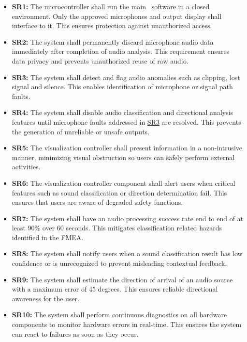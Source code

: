 \documentclass{article}
\begin{document}
\begin{itemize}
    \item \label{SR1}\textbf{SR1:} The microcontroller shall run the main
    \progname ~software in a closed environment. Only the approved microphones
    and output display shall interface to it. This ensures protection against
    unauthorized access.

    \item \label{SR2}\textbf{SR2:} The system shall permanently discard
    microphone audio data immediately after completion of audio analysis. This
    requirement ensures data privacy and prevents unauthorized reuse of raw
    audio.

    \item \label{SR3}\textbf{SR3:} The system shall detect and flag audio
    anomalies such as clipping, lost signal and silence. This enables
    identification of microphone or signal path faults.

    \item \label{SR4}\textbf{SR4:} The system shall disable audio classification
    and directional analysis features until microphone faults addressed in
    \hyperref[SR3]{SR3} are resolved. This prevents the generation of unreliable
    or unsafe outputs.

    \item \label{SR5}\textbf{SR5:} The visualization controller shall present
    information in a non-intrusive manner, minimizing visual obstruction so
    users can safely perform external activities.

    \item \label{SR6}\textbf{SR6:} The visualization controller component shall
    alert users when critical features such as sound classification or direction
    determination fail. This ensures that users are aware of degraded safety
    functions.

    \item \label{SR7}\textbf{SR7:} The system shall have an audio processing
    success rate end to end of at least 90\% over 60 seconds. This mitigates
    classification related hazards identified in the FMEA.

    \item \label{SR8}\textbf{SR8:} The system shall notify users when a sound
    classification result has low confidence or is unrecognized to prevent
    misleading contextual feedback.

    \item \label{SR9}\textbf{SR9:} The system shall estimate the direction of
    arrival of an audio source with a maximum error of 45 degrees. This ensures
    reliable directional awareness for the user.

    \item \label{SR10}\textbf{SR10:} The system shall perform continuous
    diagnostics on all hardware components to monitor hardware errors in
    real-time. This ensures the system can react to failures as soon as they
    occur.
    
\end{itemize}
\end{document}
